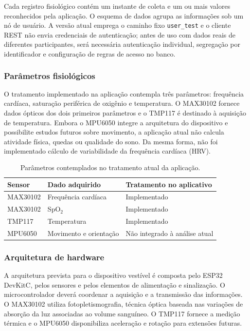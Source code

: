 \documentclass[12pt]{article}
\begin{document}
Cada registro fisiológico contém um instante de coleta e um ou mais valores reconhecidos pela aplicação. O esquema de dados agrupa as informações sob um nó de usuário. A versão atual emprega o caminho fixo \texttt{user\_test} e o cliente REST não envia credenciais de autenticação; antes de uso com dados reais de diferentes participantes, será necessária autenticação individual, segregação por identificador e configuração de regras de acesso no banco.

\subsubsection{Parâmetros fisiológicos}

O tratamento implementado na aplicação contempla três parâmetros: frequência cardíaca, saturação periférica de oxigênio e temperatura. O MAX30102 fornece dados ópticos dos dois primeiros parâmetros e o TMP117 é destinado à aquisição de temperatura. Embora o MPU6050 integre a arquitetura do dispositivo e possibilite estudos futuros sobre movimento, a aplicação atual não calcula atividade física, quedas ou qualidade do sono. Da mesma forma, não foi implementado cálculo de variabilidade da frequência cardíaca (HRV).

\begin{table}[H]
\centering
\caption{Parâmetros contemplados no tratamento atual da aplicação.}
\label{tab:parametros-monitorados}
\begin{tabular}{|l|l|l|}
\hline
\textbf{Sensor} & \textbf{Dado adquirido} & \textbf{Tratamento no aplicativo} \\ \hline
MAX30102 & Frequência cardíaca & Implementado \\ \hline
MAX30102 & SpO$_2$ & Implementado \\ \hline
TMP117 & Temperatura & Implementado \\ \hline
MPU6050 & Movimento e orientação & Não integrado à análise atual \\ \hline
\end{tabular}
\end{table}

\subsubsection{Arquitetura de hardware}

A arquitetura prevista para o dispositivo vestível é composta pelo ESP32 DevKitC, pelos sensores e pelos elementos de alimentação e sinalização. O microcontrolador deverá coordenar a aquisição e a transmissão das informações. O MAX30102 utiliza fotopletismografia, técnica óptica baseada nas variações de absorção da luz associadas ao volume sanguíneo. O TMP117 fornece a medição térmica e o MPU6050 disponibiliza aceleração e rotação para extensões futuras.
\end{document}
